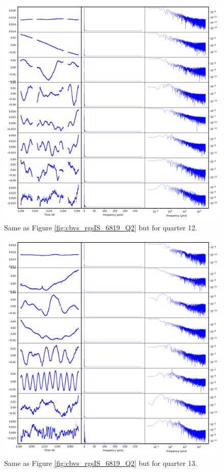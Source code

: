 \begin{figure}
    \centering
    \includegraphics[width=\linewidth]{Chapter_Appended/AppB/cbv_6819_rgs_q12.png}
    \caption{Same as Figure \ref{fig:cbvs_rgsIS_6819_Q2} but for quarter 12.}
    \label{fig:cbvs_rgsIS_6819_Q12}
\end{figure}


\begin{figure}
    \centering
    \includegraphics[width=\linewidth]{Chapter_Appended/AppB/cbv_6819_rgs_q13.png}
    \caption{Same as Figure \ref{fig:cbvs_rgsIS_6819_Q2} but for quarter 13.}
    \label{fig:cbvs_rgsIS_6819_Q13}
\end{figure}


